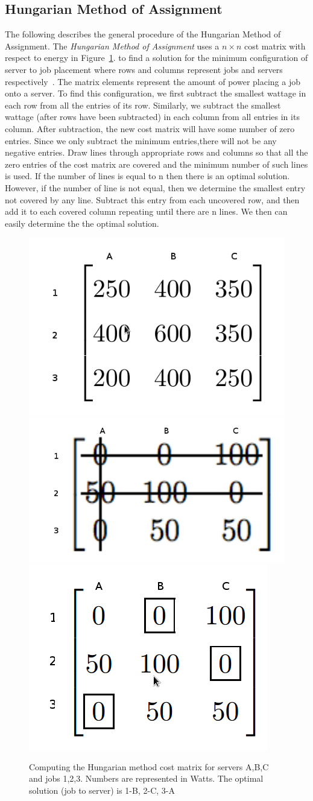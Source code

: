 \documentclass{sig-alternate}
\begin{document}
\subsection{Hungarian Method of Assignment}
\label{sec:HMA}

The following describes the general procedure of the Hungarian Method of Assignment. The \emph{Hungarian Method of Assignment} uses a $n \times n$ cost matrix with respect to energy in Figure~\ref{fig:HMA}. to find a solution for the minimum configuration of server to job placement where rows and columns represent jobs and servers respectively~\cite{Han}. The matrix elements represent the amount of power placing a job onto a server. To find this configuration, we first subtract the smallest wattage in each row from all the entries of its row. Similarly, we subtract the smallest wattage (after rows have been subtracted) in each column from all entries in its column. After subtraction, the new cost matrix will have some number of zero entries. Since we only subtract the minimum entries,there will not be any negative entries. Draw lines through appropriate rows and columns so that all the zero entries of the cost matrix are covered and the minimum number of such lines is used.  If the number of lines is equal to n then there is an optimal solution. However, if the number of line is not equal, then we determine the smallest entry not covered by any line. Subtract this entry from each uncovered row, and then add it to each covered column repeating until there are n lines.  We then can easily determine the the optimal solution. 

\begin{figure}[tb]
 \centering
 \includegraphics[height=0.25 \textwidth]{s}
 \includegraphics[height=0.20 \textwidth]{s2}
 \includegraphics[height=0.25 \textwidth]{s3}
 \caption{Computing the Hungarian method cost matrix for servers A,B,C and jobs 1,2,3. Numbers are represented in Watts. The optimal solution (job to server) is 1-B, 2-C, 3-A}
 \label{fig:HMA}
\end{figure}
\end{document}
